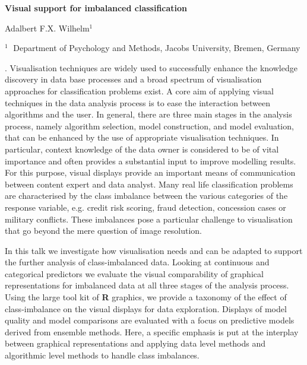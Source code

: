 \documentclass[12pt]{article}
\begin{document}
\begin{flushleft}


{\LARGE\bf Visual support for imbalanced classification}


\vspace{1.0cm}

Adalbert F.X. Wilhelm$^1$ 

\begin{description}

\item $^1 \;$ Department of Psychology and Methods, Jacobs University, Bremen, Germany

\end{description}

\end{flushleft}


\vspace{0.75cm}

. Visualisation techniques are widely used to successfully enhance the knowledge discovery in data base processes and a broad spectrum of visualisation approaches for classification problems exist. A core aim of applying visual techniques in the data analysis process is to ease the interaction between algorithms and the user. In general, there are three main stages in the analysis process, namely algorithm selection, model construction, and model evaluation, that can be enhanced by the use of appropriate visualisation techniques.  In particular, context knowledge of the data owner is considered to be of vital importance and often provides a substantial input to improve modelling results. For this purpose, visual displays provide an important means of communication between content expert and data analyst.
Many real life classification problems are characterised by the class imbalance between the various categories of the response variable, e.g. credit risk scoring, fraud detection, concession cases or military conflicts. These imbalances pose a particular challenge to visualisation that go beyond the mere question of image resolution.

In this talk we investigate how visualisation needs and can be adapted to support the further analysis of class-imbalanced data. Looking at continuous and categorical predictors we evaluate the visual comparability of graphical representations for imbalanced data at all three stages of the analysis process. Using the large tool kit of \textbf{R} graphics, we provide a taxonomy of  the effect of class-imbalance on the visual displays for data exploration. Displays of model quality and model comparisons are evaluated with a focus on predictive models derived from ensemble methods.
Here, a specific emphasis is put at the interplay between graphical representations and applying data level methods and algorithmic level methods to handle class imbalances. 
\vskip 2mm
\end{document}
